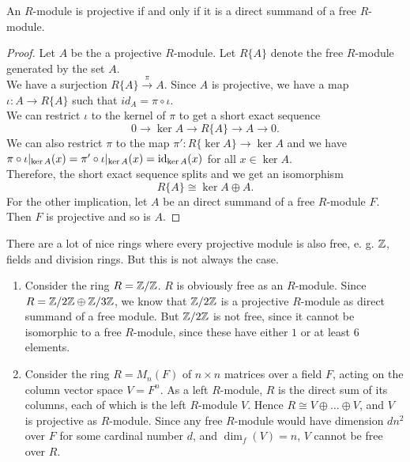 \begin{proposition}
	An $R$-module is projective if and only if it is a direct summand of a free $R$-module.
\end{proposition}

\begin{proof}
	Let $A$ be the a projective $R$-module. Let $R\{A\}$ denote the free $R$-module generated by the set $A$. \\
	We have a surjection $R\{A\}\overset{\pi}{\longrightarrow}A$.
	Since $A$ is projective, we have a map $\iota:A\rightarrow R\{A\}$ such that $id_A=\pi\circ\iota$. \\
	We can restrict $\iota$ to the kernel of $\pi$ to get a short exact sequence
	$$0\rightarrow \ker A \rightarrow R\{A\} \rightarrow A \rightarrow 0.$$
	We can also restrict $\pi$ to the map $\pi':R\{\ker A\}\rightarrow \ker A$ and we have $\pi\circ\iota\vert_{\ker A}(x) = \pi'\circ\iota\vert_{\ker A}(x) = \operatorname{id}_{\ker A}(x)$ for all $x\in\ker A$. \\
	Therefore, the short exact sequence splits and we get an isomorphism $$R\{A\}\cong \ker A \oplus A.$$
	For the other implication, let $A$ be an direct summand of a free $R$-module $F$. Then $F$ is projective and so is $A$. 
\end{proof}

\begin{example}
	There are a lot of nice rings where every projective module is also free, e. g. ${\mathbb Z}$, fields and division rings.
	But this is not always the case.
	\begin{enumerate}[label=(\roman*)]
		\item Consider the ring $R={\mathbb Z}/{\mathbb Z}$.
		$R$ is obviously free as an $R$-module.
		Since $R={\mathbb Z}/2{\mathbb Z} \oplus {\mathbb Z}/3{\mathbb Z}$, we know that ${\mathbb Z}/2{\mathbb Z}$ is a projective $R$-module as direct summand of a free module.
		But ${\mathbb Z}/2{\mathbb Z}$ is not free, since it cannot be isomorphic to a free $R$-module, since these have either $1$ or at least $6$ elements.
		
		\item Consider the ring $R=M_n(F)$ of $n\times n$ matrices over a field $F$, acting on the column vector space $V=F^n$.
		As a left $R$-module, $R$ is the direct sum of its columns, each of which is the left $R$-module $V$.
		Hence $R\cong V\oplus\dots\oplus V$, and $V$ is projective as $R$-module.
		Since any free $R$-module would have dimension $dn^2$ over $F$ for some cardinal number $d$, and $\dim_f(V)=n$, $V$ cannot be free over $R$.
	\end{enumerate}
\end{example}

